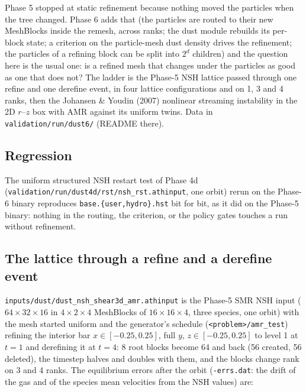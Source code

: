 \documentclass[11pt]{article}
\newcommand{\code}[1]{\texttt{#1}}
\newcommand{\file}[1]{\texttt{#1}}
\begin{document}
Phase 5 stopped at static refinement because nothing moved the particles when the tree
changed. Phase 6 adds that (the particles are routed to their new MeshBlocks inside the
remesh, across ranks; the dust module rebuilds its per-block state; a criterion on the
particle-mesh dust density drives the refinement; the particles of a refining block can
be split into $2^d$ children) and the question here is the usual one: is a refined mesh
that changes under the particles as good as one that does not? The ladder is the Phase-5
NSH lattice passed through one refine and one derefine event, in four lattice
configurations and on 1, 3 and 4 ranks, then the Johansen \& Youdin (2007) nonlinear
streaming instability in the 2D $r$--$z$ box with AMR against its uniform twins. Data in
\file{validation/run/dust6/} (README there).

\subsection{Regression}

The uniform structured NSH restart test of Phase 4d
(\file{validation/run/dust4d/rst/nsh\_rst.athinput}, one orbit) rerun on the Phase-6
binary reproduces \file{base.\{user,hydro\}.hst} bit for bit, as it did on the Phase-5
binary: nothing in the routing, the criterion, or the policy gates touches a run without
refinement.

\subsection{The lattice through a refine and a derefine event}
\label{sec:phase6-lattice}

\file{inputs/dust/dust\_nsh\_shear3d\_amr.athinput} is the Phase-5 SMR NSH input
($64\times32\times16$ in $4\times2\times4$ MeshBlocks of $16\times16\times4$, three species,
one orbit) with the mesh started uniform and the generator's schedule
(\code{<problem>/amr\_test}) refining the interior bar $x \in [-0.25,0.25]$, full $y$,
$z \in [-0.25,0.25]$ to level 1 at $t = 1$ and derefining it at $t = 4$: 8 root blocks
become 64 and back (56 created, 56 deleted), the timestep halves and doubles with them,
and the blocks change rank on 3 and 4 ranks. The equilibrium errors after the orbit
(\file{-errs.dat}: the drift of the gas and of the species mean velocities from the NSH
values) are:
\end{document}

